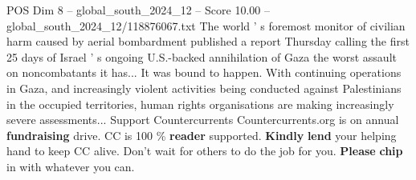 \begin{textsample}{POS Dim 8 – global\_south\_2024\_12 – Score 10.00 – global\_south\_2024\_12/118876067.txt}
The world ' s foremost monitor of civilian harm caused by aerial bombardment published a report Thursday calling the first 25 days of Israel ' s ongoing U.S.-backed annihilation of Gaza the worst assault on noncombatants it has...
It was bound to happen.
With continuing operations in Gaza, and increasingly violent activities being conducted against Palestinians in the occupied territories, human rights organisations are making increasingly severe assessments...
Support Countercurrents Countercurrents.org is on annual \textbf{fundraising} drive.
CC is 100 \% \textbf{reader} supported. \textbf{Kindly} \textbf{lend} your helping hand to keep CC alive.
Don't wait for others to do the job for you. \textbf{Please} \textbf{chip} in with whatever you can.

\end{textsample}
